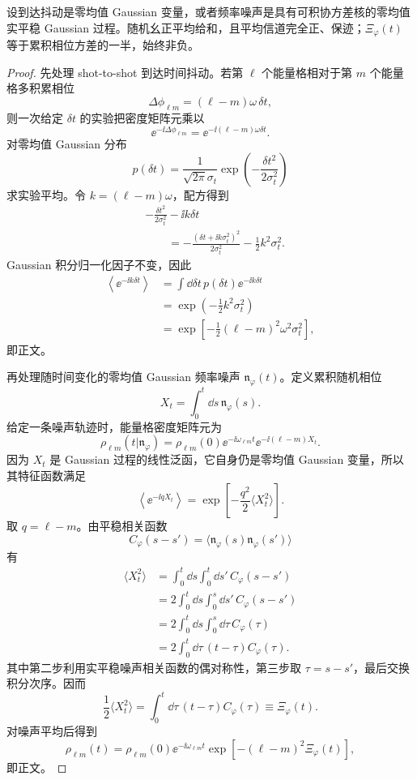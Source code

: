 \begin{proposition}
设到达抖动是零均值 Gaussian 变量，或者频率噪声是具有可积协方差核的零均值实平稳 Gaussian 过程。随机幺正平均给和，且平均信道完全正、保迹；$\Xi_\varphi(t)$ 等于累积相位方差的一半，始终非负。
\end{proposition}
\begin{proof}
先处理 shot-to-shot 到达时间抖动。若第 $\ell$ 个能量格相对于第 $m$ 个能量格多积累相位
\[
\Delta\phi_{\ell m}=(\ell-m)\omega\,\delta t,
\]
则一次给定 $\delta t$ 的实验把密度矩阵元乘以
\[
\ee^{-\ii\Delta\phi_{\ell m}}
=\ee^{-\ii(\ell-m)\omega\delta t}.
\]
对零均值 Gaussian 分布
\[
p(\delta t)=\frac1{\sqrt{2\pi}\sigma_t}
\exp\!\left(-\frac{\delta t^2}{2\sigma_t^2}\right)
\]
求实验平均。令 $k=(\ell-m)\omega$，配方得到
\begin{align*}
&-\frac{\delta t^2}{2\sigma_t^2}-\ii k\delta t\\
&\qquad=-\frac{(\delta t+\ii k\sigma_t^2)^2}{2\sigma_t^2}
-\frac12k^2\sigma_t^2.
\end{align*}
Gaussian 积分归一化因子不变，因此
\begin{align*}
\left\langle\ee^{-\ii k\delta t}\right\rangle
&=\int\dd\delta t\,p(\delta t)\ee^{-\ii k\delta t}\\
&=\exp\!\left(-\frac12k^2\sigma_t^2\right)\\
&=\exp\!\left[-\frac12(\ell-m)^2\omega^2\sigma_t^2\right],
\end{align*}
即正文。

再处理随时间变化的零均值 Gaussian 频率噪声 $\mathfrak n_\varphi(t)$。定义累积随机相位
\[
X_t=\int_0^t\dd s\,\mathfrak n_\varphi(s).
\]
给定一条噪声轨迹时，能量格密度矩阵元为
\[
\rho_{\ell m}(t|\mathfrak n_\varphi)
=\rho_{\ell m}(0)\ee^{-\ii\omega_{\ell m}t}
\ee^{-\ii(\ell-m)X_t}.
\]
因为 $X_t$ 是 Gaussian 过程的线性泛函，它自身仍是零均值 Gaussian 变量，所以其特征函数满足
\[
\left\langle\ee^{-\ii qX_t}\right\rangle
=\exp\!\left[-\frac{q^2}{2}\langle X_t^2\rangle\right].
\]
取 $q=\ell-m$。由平稳相关函数
\[
C_\varphi(s-s')
=\langle\mathfrak n_\varphi(s)\mathfrak n_\varphi(s')\rangle
\]
有
\begin{align*}
\langle X_t^2\rangle
&=\int_0^t\dd s\int_0^t\dd s'\,C_\varphi(s-s')\\
&=2\int_0^t\dd s\int_0^s\dd s'\,C_\varphi(s-s')\\
&=2\int_0^t\dd s\int_0^s\dd\tau\,C_\varphi(\tau)\\
&=2\int_0^t\dd\tau\,(t-\tau)C_\varphi(\tau).
\end{align*}
其中第二步利用实平稳噪声相关函数的偶对称性，第三步取 $\tau=s-s'$，最后交换积分次序。因而
\[
\frac12\langle X_t^2\rangle
=\int_0^t\dd\tau\,(t-\tau)C_\varphi(\tau)
\equiv\Xi_\varphi(t).
\]
对噪声平均后得到
\[
\rho_{\ell m}(t)
=\rho_{\ell m}(0)\ee^{-\ii\omega_{\ell m}t}
\exp[-(\ell-m)^2\Xi_\varphi(t)],
\]
即正文。
\end{proof}


